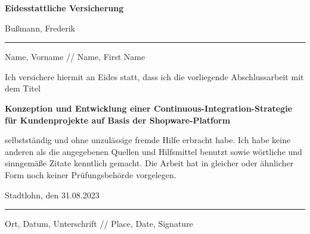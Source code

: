
\thispagestyle{empty}
    \begingroup
        \fontsize{18pt}{20pt}\selectfont
        {\bfseries Eidesstattliche Versicherung}
    \endgroup

    \vskip 0.8cm

    \begingroup
        \fontsize{12pt}{18pt}\selectfont
        Bußmann, Frederik
    \endgroup

    \vskip -0.35cm

    \noindent\rule{14cm}{0.4pt}

    \vskip -0.2cm

    \begingroup
        \fontsize{8pt}{6pt}\selectfont
        Name, Vorname // Name, First Name
    \endgroup

    \vskip 0.6cm
    \begingroup
        \fontsize{10.5pt}{11.5pt}\selectfont
        Ich versichere hiermit an Eides statt, dass ich die vorliegende Abschlussarbeit mit dem Titel
    \endgroup

    \vskip 0.3cm

    \begingroup
        \fontsize{12pt}{18pt}\selectfont
        {\bfseries Konzeption und Entwicklung einer Continuous-Integration-Strategie für Kundenprojekte auf Basis der
        Shopware-Platform}
    \endgroup

    \vskip 0.3cm

    \begingroup
        \fontsize{10.5pt}{11.5pt}\selectfont
        selbstständig und ohne unzulässige fremde Hilfe erbracht habe.
        Ich habe keine anderen als die angegebenen Quellen und Hilfsmittel benutzt sowie wörtliche und sinngemäße
        Zitate kenntlich gemacht.
        Die Arbeit hat in gleicher oder ähnlicher Form noch keiner Prüfungsbehörde vorgelegen.
    \endgroup

    \vskip 0.8cm
    {\fontsize{12pt}{18pt}\selectfont
    Stadtlohn, den 31.08.2023}

    \vskip -0.35cm

    \noindent\rule{14cm}{0.4pt}

    \vskip -0.2cm

    \begingroup
        \fontsize{8pt}{6pt}\selectfont
        Ort, Datum, Unterschrift // Place, Date, Signature
    \endgroup
\restoregeometry
\clearpage
